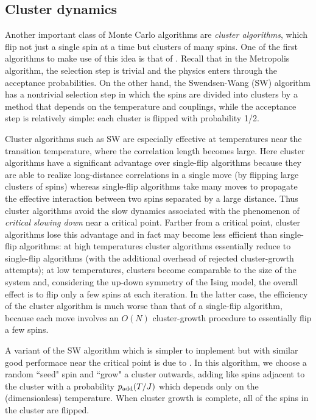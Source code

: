 \subsection{Cluster dynamics}
\label{sec:numerical-cluster}

Another important class of Monte Carlo algorithms are \emph{cluster
  algorithms}, which flip not just a single spin at a time but clusters of many
spins. One of the first algorithms to make use of this idea is that of
\textcite{swendsen1987nonuniversal}. Recall that in the Metropolis algorithm,
the selection step is trivial and the physics enters through the acceptance
probabilities. On the other hand, the Swendsen-Wang (SW) algorithm has a
nontrivial selection step in which the spins are divided into clusters by a
method that depends on the temperature and couplings, while the acceptance step
is relatively simple: each cluster is flipped with probability 1/2.

Cluster algorithms such as SW are especially effective at temperatures near the
transition temperature, where the correlation length becomes large. Here
cluster algorithms have a significant advantage over single-flip algorithms
because they are able to realize long-distance correlations in a single move
(by flipping large clusters of spins) whereas single-flip algorithms take many
moves to propagate the effective interaction between two spins separated by a
large distance. Thus cluster algorithms avoid the slow dynamics associated with
the phenomenon of \emph{critical slowing down} near a critical point. Farther
from a critical point, cluster algorithms lose this advantage and in fact may
become less efficient than single-flip algorithms: at high temperatures cluster
algorithms essentially reduce to single-flip algorithms (with the additional
overhead of rejected cluster-growth attempts); at low temperatures, clusters
become comparable to the size of the system and, considering the up-down
symmetry of the Ising model, the overall effect is to flip only a few spins at
each iteration. In the latter case, the efficiency of the cluster algorithm is
much worse than that of a single-flip algorithm, because each move involves an
$O(N)$ cluster-growth procedure to essentially flip a few spins.

A variant of the SW algorithm which is simpler to implement but with similar
good performace near the critical point is due to
\textcite{wolff1989collective}. In this algorithm, we choose a random ``seed"
spin and ``grow" a cluster outwards, adding like spins adjacent to the cluster
with a probability $p_{\mathrm{add}}(T/J)$ which depends only on the (dimensionless)
temperature. When cluster growth is complete, all of the spins in the cluster
are flipped.

